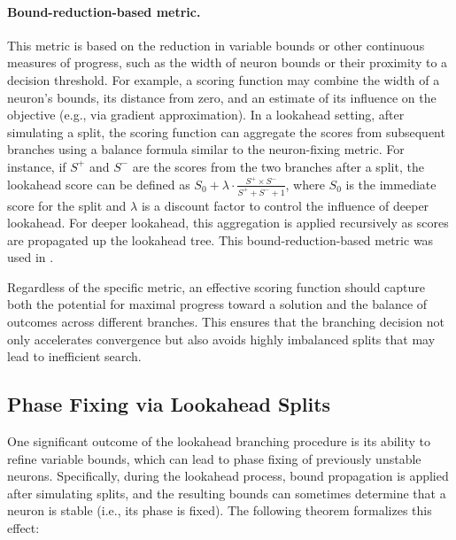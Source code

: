 \documentclass{article}
\begin{document}
\paragraph{Bound-reduction-based metric.}
This metric is based on the reduction in variable bounds or other continuous measures of progress, such as the width of neuron bounds or their proximity to a decision threshold. For example, a scoring function may combine the width of a neuron's bounds, its distance from zero, and an estimate of its influence on the objective (e.g., via gradient approximation). In a lookahead setting, after simulating a split, the scoring function can aggregate the scores from subsequent branches using a balance formula similar to the neuron-fixing metric. For instance, if $S^+$ and $S^-$ are the scores from the two branches after a split, the lookahead score can be defined as $S_0 + \lambda \cdot \frac{S^+ \times S^-}{S^+ + S^- + 1}$, where $S_0$ is the immediate score for the split and $\lambda$ is a discount factor to control the influence of deeper lookahead. For deeper lookahead, this aggregation is applied recursively as scores are propagated up the lookahead tree. This bound-reduction-based metric was used in \abcrown.

Regardless of the specific metric, an effective scoring function should capture both the potential for maximal progress toward a solution and the balance of outcomes across different branches. This ensures that the branching decision not only accelerates convergence but also avoids highly imbalanced splits that may lead to inefficient search.

\subsection{Phase Fixing via Lookahead Splits}
\label{subsec:phase_fixing}

One significant outcome of the lookahead branching procedure is its ability to refine variable bounds, which can lead to phase fixing of previously unstable neurons. Specifically, during the lookahead process, bound propagation is applied after simulating splits, and the resulting bounds can sometimes determine that a neuron is stable (i.e., its phase is fixed). The following theorem formalizes this effect:
\end{document}
